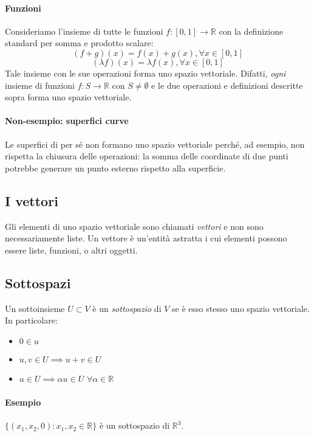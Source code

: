 \documentclass{article}
\begin{document}
            \paragraph{Funzioni}
                Consideriamo l'insieme di tutte le funzioni $f : [0,1] \to \mathbb{R}$ con la definizione standard per somma e prodotto 
                scalare:
                \[(f+g)(x) = f(x)+g(x), \forall x \in [0,1] \]
                \[(\lambda f)(x) = \lambda f(x), \forall x \in [0,1] \]
                Tale insieme con le sue operazioni forma uno spazio vettoriale. Difatti, \emph{ogni} insieme di funzioni $f:S \to \mathbb{R}$
                con $S \neq \emptyset$ e le due operazioni e definizioni descritte sopra forma uno spazio vettoriale.
            \paragraph{Non-esempio: superfici curve}
                Le superfici di per sé non formano uno spazio vettoriale perché, ad esempio, non rispetta la chiusura 
                delle operazioni: la somma delle coordinate di due punti potrebbe generare un punto esterno rispetto alla superficie.
        \subsection{I vettori}
            Gli elementi di uno spazio vettoriale sono chiamati \emph{vettori} e non sono necessariamente liste. Un vettore è 
            un'entità astratta i cui elementi possono essere liste, funzioni, o altri oggetti.
        \subsection{Sottospazi}
            Un sottoinsieme $U \subset V$ è un \emph{sottospazio} di $V$ se è esso stesso uno spazio vettoriale. In particolare:
            \begin{itemize}
                \item $0 \in u$
                \item $u,v \in U \implies u+v \in U$
                \item $u \in U \implies \alpha u \in U$ $\forall \alpha \in \mathbb{R}$
            \end{itemize}
            \paragraph{Esempio}
            $\{(x_1, x_2, 0) : x_1,x_2 \in \mathbb{R}\}$ è un sottospazio di $\mathbb{R}^3$.
\end{document}
